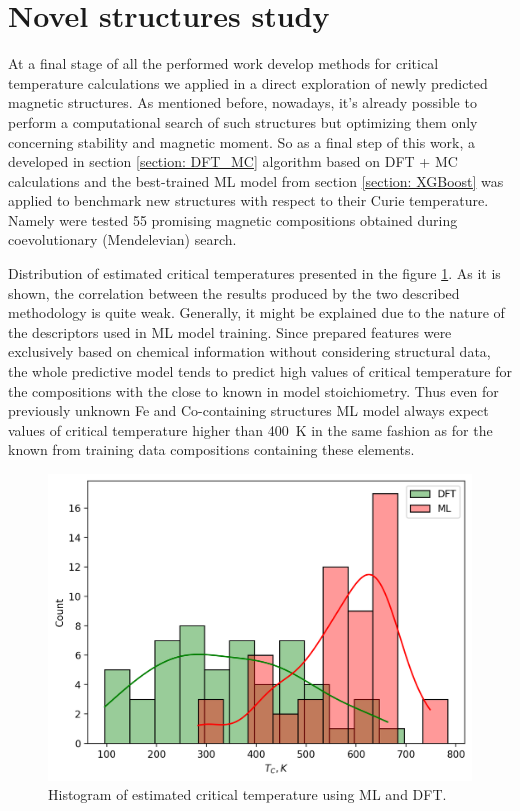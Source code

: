 \section{Novel structures study}

At a final stage of all the performed work develop methods for critical temperature calculations we applied in a direct exploration of newly predicted magnetic structures. As mentioned before, nowadays, it's already possible to perform a computational search of such structures but optimizing them only concerning stability and magnetic moment. So as a final step of this work, a developed in section \ref{section: DFT_MC} algorithm based on DFT + MC calculations and the best-trained ML model from section \ref{section: XGBoost} was applied to benchmark new structures with respect to their Curie temperature.  Namely were tested 55 promising magnetic compositions obtained during coevolutionary (Mendelevian) search.


Distribution of estimated critical temperatures presented in the figure \ref{fig:dft_hist}. As it is shown, the correlation between the results produced by the two described methodology is quite weak. Generally, it might be explained due to the nature of the descriptors used in ML model training. Since prepared features were exclusively based on chemical information without considering structural data, the whole predictive model tends to predict high values of critical temperature for the compositions with the close to known in model stoichiometry. Thus even for previously unknown Fe and Co-containing structures ML model always expect values of critical temperature higher than 400~K in the same fashion as for the known from training data compositions containing these elements.


\begin{figure}[H]
	\centering
	\includegraphics[width=120mm]{fig/dft_fig/ml_dft_hist.png}
	\caption[Histogram of estimated critical temperature using ML and DFT.]{Histogram of estimated critical temperature using ML and DFT.}
\label{fig:dft_hist}
\end{figure}


